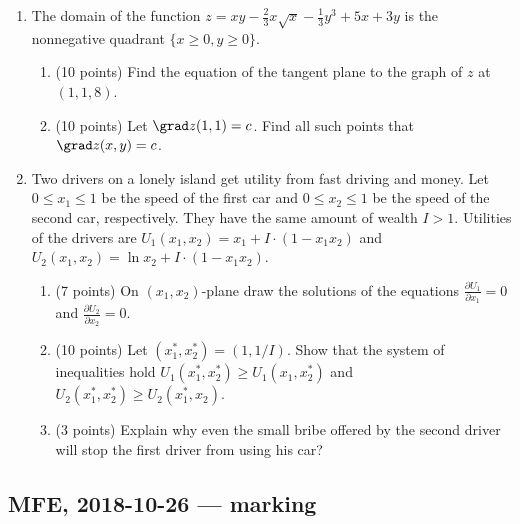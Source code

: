 \begin{enumerate}
\item The domain of the function $z = xy - \frac{2}{3}x\sqrt{x} - \frac{1}{3}y^3 +5x+3y$
is the nonnegative quadrant $\{x\geq 0, y \geq 0\}$.
\begin{enumerate}
  \item (10 points) Find the equation of the tangent plane to the graph of $z$ at $(1,1,8)$.
  \item  (10 points) Let $\grad z(1,1) = c$. Find all such points that $\grad z(x,y)=c$.
\end{enumerate}

\item Two drivers on a lonely island get utility from fast driving and money.
Let $0\leq x_1 \leq 1$ be the speed of the first car
and $0\leq x_2 \leq 1$ be the speed of the second car, respectively.
They have the same amount of wealth $I>1$. Utilities of the drivers are
$U_1(x_1, x_2) = x_1 + I\cdot (1 - x_1 x_2)$ and $U_2(x_1, x_2) = \ln x_2 + I\cdot (1 - x_1 x_2)$.
\begin{enumerate}
  \item (7 points) On $(x_1, x_2)$-plane draw the solutions of
  the equations $\frac{\partial U_1}{\partial x_1}=0$ and $\frac{\partial U_2}{\partial x_2}=0$.
  \item (10 points) Let $(x_1^*, x_2^*)=(1, 1/I)$.
  Show that the system of inequalities hold $U_1(x_1^*, x_2^*)\geq U_1(x_1, x_2^*)$
  and  $U_2(x_1^*, x_2^*)\geq U_2(x_1^*, x_2)$.
  \item (3 points) Explain why even the small bribe
  offered by the second driver will stop the first driver from using his car?
\end{enumerate}


\end{enumerate}



\subsection{MFE, 2018-10-26 — marking}


